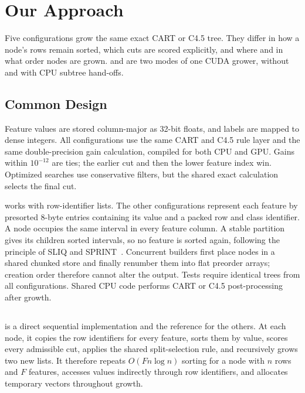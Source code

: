 \section{Our Approach}
\label{sec:impl}

Five configurations grow the same exact CART or C4.5 tree. They differ in how a node's rows remain sorted, which cuts are scored explicitly, and where and in what order nodes are grown. \ImplGpu{} and \ImplHybrid{} are two modes of one CUDA grower, without and with CPU subtree hand-offs.

\subsection{Common Design}
\label{sec:impl-common}

Feature values are stored column-major as 32-bit floats, and labels are mapped to dense integers. All configurations use the same CART and C4.5 rule layer and the same double-precision gain calculation, compiled for both CPU and GPU. Gains within \(10^{-12}\) are ties; the earlier cut and then the lower feature index win. Optimized searches use conservative filters, but the shared exact calculation selects the final cut.

\ImplSerialBase{} works with row-identifier lists. The other configurations represent each feature by presorted 8-byte entries containing its value and a packed row and class identifier. A node occupies the same interval in every feature column. A stable partition gives its children sorted intervals, so no feature is sorted again, following the principle of SLIQ and SPRINT~\cite{mehta1996sliq,shafer1996sprint}. Concurrent builders first place nodes in a shared chunked store and finally renumber them into flat preorder arrays; creation order therefore cannot alter the output. Tests require identical trees from all configurations. Shared CPU code performs CART or C4.5 post-processing after growth.

\subsection{\ImplSerialBase}
\label{sec:impl-simple}

\ImplSerialBase{} is a direct sequential implementation and the reference for the others. At each node, it copies the row identifiers for every feature, sorts them by value, scores every admissible cut, applies the shared split-selection rule, and recursively grows two new lists. It therefore repeats \(O(Fn\log n)\) sorting for a node with \(n\) rows and \(F\) features, accesses values indirectly through row identifiers, and allocates temporary vectors throughout growth.

